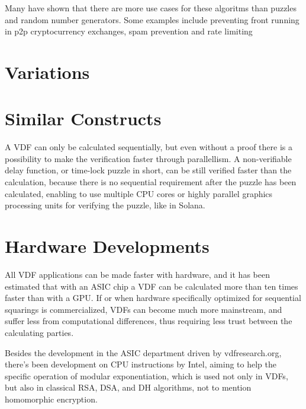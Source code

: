 Many have shown that there are more use cases for these algoritms than puzzles and random number generators. Some examples include preventing front running in p2p cryptocurrency exchanges, spam prevention and rate limiting\cite{noauthor_undated-hk}


\section{Variations}


\section{Similar Constructs}
A VDF can only be calculated sequentially, but even without a proof there is a possibility to make the verification faster through parallellism. A non-verifiable delay function, or time-lock puzzle in short, can be still verified faster than the calculation, because there is no sequential requirement after the puzzle has been calculated, enabling to use multiple CPU cores or highly parallel graphics processing units for verifying the puzzle, like in Solana.\cite{Yakovenko2018-zn} 

\section{Hardware Developments}
All VDF applications can be made faster with hardware, and it has been estimated that with an ASIC chip a VDF can be calculated more than ten times faster than with a GPU.\cite{Stanford_Video2020-ap} If or when hardware specifically optimized for sequential squarings is commercialized, VDFs can become much more mainstream, and suffer less from computational differences, thus requiring less trust between the calculating parties.

Besides the development in the ASIC department driven by vdfresearch.org\cite{noauthor_undated-hk}, there's been development on CPU instructions by Intel, aiming to help the specific operation of modular exponentiation, which is used not only in VDFs, but also in classical RSA, DSA, and DH algorithms, not to mention homomorphic encryption.\cite{Drucker2019-cx} 
